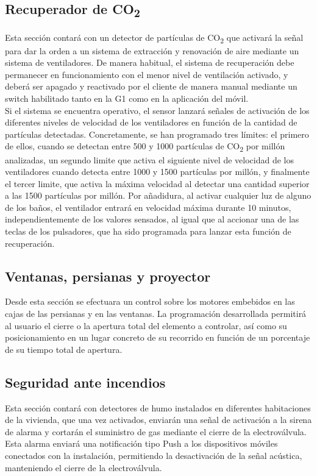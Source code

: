 \subsection{Recuperador de CO\textsubscript{2}}Esta sección contará con un detector de partículas de CO\textsubscript{2} que activará la señal para dar la orden a un sistema de extracción y renovación de aire mediante un sistema de ventiladores. De manera habitual, el sistema de recuperación debe permanecer en funcionamiento con el menor nivel de ventilación activado, y deberá ser apagado y reactivado por el cliente de manera manual mediante un switch habilitado tanto en la G1 como en la aplicación del móvil. \\ 
Si el sistema se encuentra operativo, el sensor lanzará señales de activación de los diferentes niveles de velocidad de los ventiladores en función de la cantidad de partículas detectadas. Concretamente, se han programado tres límites: el primero de ellos, cuando se detectan entre 500 y 1000 partículas de CO\textsubscript{2} por millón analizadas, un segundo limite que activa el siguiente nivel de velocidad de los ventiladores cuando detecta entre 1000 y 1500 partículas por millón, y finalmente el tercer limite, que activa la máxima velocidad al detectar una cantidad superior a las 1500 partículas por millón. Por añadidura, al activar cualquier luz de alguno de los baños, el ventilador entrará en velocidad máxima durante 10 minutos, independientemente de los valores sensados, al igual que al accionar una de las teclas de los pulsadores, que ha sido programada para lanzar esta función de recuperación.\\
\subsection{Ventanas, persianas y proyector}Desde esta sección se efectuara un control sobre los motores embebidos en las cajas de las persianas y en las ventanas. La programación desarrollada permitirá al usuario el cierre o la apertura total del elemento a controlar, así como su posicionamiento en un lugar concreto de su recorrido en función de un porcentaje de su tiempo total de apertura.\\
\subsection{Seguridad ante incendios }Esta sección contará con detectores de humo instalados en diferentes habitaciones de la vivienda, que una vez activados, enviarán una señal de activación a la sirena de alarma y cortarán el suministro de gas mediante el cierre de la electroválvula. Esta alarma enviará una notificación tipo Push a los dispositivos móviles conectados con la instalación, permitiendo la desactivación de la señal acústica, manteniendo el cierre de la electroválvula.\\
